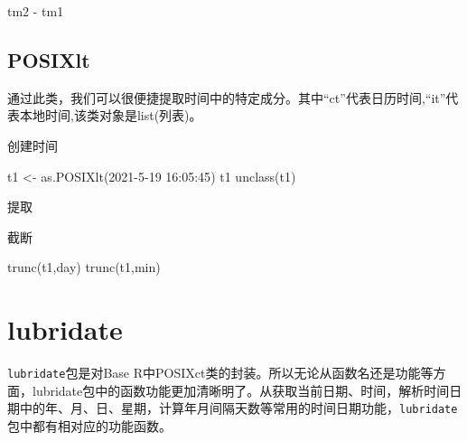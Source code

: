 \documentclass[
]{book}
\newenvironment{Shaded}{\begin{snugshade}}{\end{snugshade}}
\newcommand{\FunctionTok}[1]{\textcolor[rgb]{0.00,0.00,0.00}{#1}}
\newcommand{\NormalTok}[1]{#1}
\newcommand{\OtherTok}[1]{\textcolor[rgb]{0.56,0.35,0.01}{#1}}
\newcommand{\SpecialCharTok}[1]{\textcolor[rgb]{0.00,0.00,0.00}{#1}}
\newcommand{\StringTok}[1]{\textcolor[rgb]{0.31,0.60,0.02}{#1}}
\begin{document}
\begin{Shaded}
\begin{Highlighting}[]
\NormalTok{tm2 }\SpecialCharTok{{-}}\NormalTok{ tm1}
\end{Highlighting}
\end{Shaded}

\hypertarget{the-POSIXlt-class}{%
\subsection{POSIXlt}\label{the-POSIXlt-class}}

通过此类，我们可以很便捷提取时间中的特定成分。其中``ct''代表日历时间,``it''代表本地时间,该类对象是list(列表)。

创建时间

\begin{Shaded}
\begin{Highlighting}[]
\NormalTok{t1 }\OtherTok{\textless{}{-}} \FunctionTok{as.POSIXlt}\NormalTok{(}\StringTok{\textquotesingle{}2021{-}5{-}19 16:05:45\textquotesingle{}}\NormalTok{)}
\NormalTok{t1}
\FunctionTok{unclass}\NormalTok{(t1)}
\end{Highlighting}
\end{Shaded}

提取

\begin{Shaded}
\end{Shaded}

截断

\begin{Shaded}
\begin{Highlighting}[]
\FunctionTok{trunc}\NormalTok{(t1,}\StringTok{\textquotesingle{}day\textquotesingle{}}\NormalTok{)}
\FunctionTok{trunc}\NormalTok{(t1,}\StringTok{\textquotesingle{}min\textquotesingle{}}\NormalTok{)}
\end{Highlighting}
\end{Shaded}

\hypertarget{lubridate}{%
\section{lubridate}\label{lubridate}}

\texttt{lubridate}包是对Base R中POSIXct类的封装。所以无论从函数名还是功能等方面，lubridate包中的函数功能更加清晰明了。从获取当前日期、时间，解析时间日期中的年、月、日、星期，计算年月间隔天数等常用的时间日期功能，\texttt{lubridate}包中都有相对应的功能函数。
\end{document}
